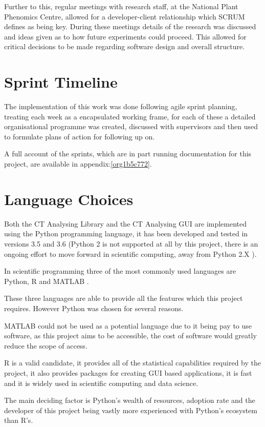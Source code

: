 \documentclass[11pt]{report}
\begin{document}
Further to this, regular meetings with research staff, at the National Plant Phenomics Centre,  allowed for a developer-client relationship which SCRUM defines as being key. During these meetings details of the research was discussed and ideas given as to how future experiments could proceed. This allowed for critical decisions to be made regarding software design and overall structure.
\section{Sprint Timeline}
\label{sec:org3597335}
The implementation of this work was done following agile sprint planning, treating each week as a encapsulated working frame, for each of these a detailed organisational programme was created, discussed with supervisors and then used to formulate plans of action for following up on.

A full account of the sprints, which are in part running documentation for this project, are available in appendix:\ref{org1b5c772}.

\section{Language Choices}
\label{sec:orgc8c2cb3}
Both the CT Analysing Library and the CT Analysing GUI are implemented using the Python programming language, it has been developed and tested in versions 3.5 and 3.6 (Python 2 is not supported at all by this project, there is an ongoing effort to move forward in scientific computing, away from Python 2.X  \cite{Ozgur2016}).

In scientific programming three of the most commonly used languages are Python, R and MATLAB \cite{Ozgur2016}.

These three languages are able to provide all the features which this project requires. However Python was chosen for several reasons.

MATLAB could not be used as a potential language due to it being pay to use software, as this project aims to be accessible, the cost of software would greatly reduce the scope of access.

R is a valid candidate, it provides all of the statistical capabilities required by the project, it also provides packages for creating GUI based applications, it is fast and it is widely used in scientific computing and data science.

The main deciding factor is Python's wealth of resources, adoption rate and the developer of this project being vastly more experienced with Python's ecosystem than R's.
\end{document}
